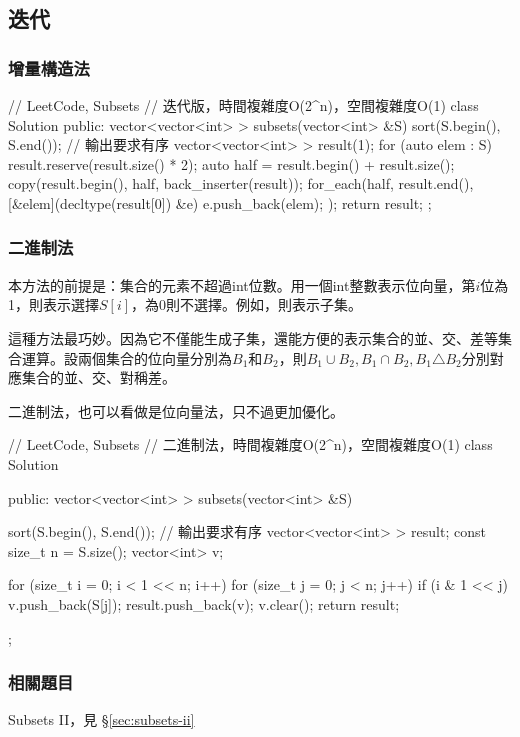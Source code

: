 \subsection{迭代}


\subsubsection{增量構造法}
\begin{Code}
// LeetCode, Subsets
// 迭代版，時間複雜度O(2^n)，空間複雜度O(1)
class Solution {
public:
    vector<vector<int> > subsets(vector<int> &S) {
        sort(S.begin(), S.end()); // 輸出要求有序
        vector<vector<int> > result(1);
        for (auto elem : S) {
            result.reserve(result.size() * 2);
            auto half = result.begin() + result.size();
            copy(result.begin(), half, back_inserter(result));
            for_each(half, result.end(), [&elem](decltype(result[0]) &e){
                e.push_back(elem);
            });
        }
        return result;
    }
};
\end{Code}


\subsubsection{二進制法}
本方法的前提是：集合的元素不超過int位數。用一個int整數表示位向量，第$i$位為1，則表示選擇$S[i]$，為0則不選擇。例如，則表示子集。

這種方法最巧妙。因為它不僅能生成子集，還能方便的表示集合的並、交、差等集合運算。設兩個集合的位向量分別為$B_1$和$B_2$，則$B_1\cup B_2, B_1 \cap B_2, B_1 \triangle B_2$分別對應集合的並、交、對稱差。

二進制法，也可以看做是位向量法，只不過更加優化。

\begin{Code}
// LeetCode, Subsets
// 二進制法，時間複雜度O(2^n)，空間複雜度O(1)
class Solution {
public:
    vector<vector<int> > subsets(vector<int> &S) {
        sort(S.begin(), S.end()); // 輸出要求有序
        vector<vector<int> > result;
        const size_t n = S.size();
        vector<int> v;

        for (size_t i = 0; i < 1 << n; i++) {
            for (size_t j = 0; j < n; j++) {
                if (i & 1 << j) v.push_back(S[j]);
            }
            result.push_back(v);
            v.clear();
        }
        return result;
    }
};
\end{Code}


\subsubsection{相關題目}
\begindot
\item Subsets II，見 \S \ref{sec:subsets-ii}
\myenddot


